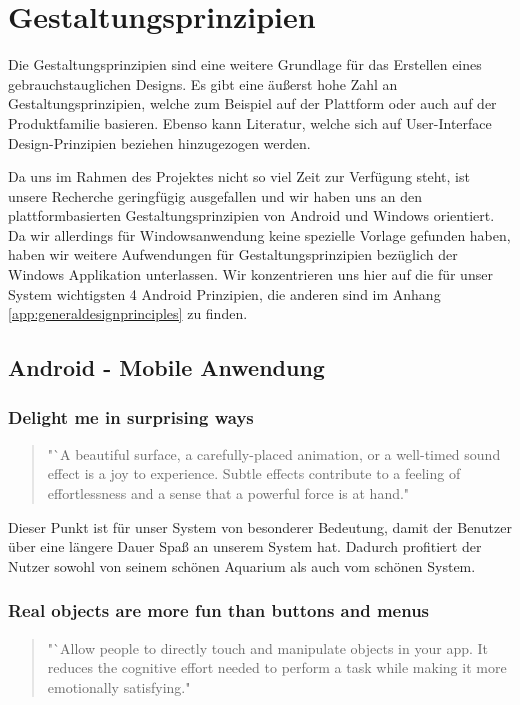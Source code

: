 \chapter{Gestaltungsprinzipien}
Die Gestaltungsprinzipien sind eine weitere Grundlage für das Erstellen eines gebrauchstauglichen Designs. Es gibt eine äußerst hohe Zahl an Gestaltungsprinzipien, welche zum Beispiel auf der Plattform oder auch auf der Produktfamilie basieren. Ebenso kann Literatur, welche sich auf User-Interface Design-Prinzipien beziehen hinzugezogen werden. 

Da uns im Rahmen des Projektes nicht so viel Zeit zur Verfügung steht, ist unsere Recherche geringfügig ausgefallen und wir haben uns an den plattformbasierten Gestaltungsprinzipien von Android \cite{Android:designprinciples} und Windows orientiert. Da wir allerdings für Windowsanwendung keine spezielle Vorlage gefunden haben, haben wir weitere Aufwendungen für Gestaltungsprinzipien bezüglich der Windows Applikation unterlassen. Wir konzentrieren uns hier auf die für unser System wichtigsten 4 Android Prinzipien, die anderen sind im Anhang \ref{app:generaldesignprinciples} zu finden.

\section{Android - Mobile Anwendung}

\subsection{Delight me in surprising ways}\label{rule:1}
\begin{quote} "`A beautiful surface, a carefully-placed animation, or a well-timed sound effect is a joy to experience. Subtle effects contribute to a feeling of effortlessness and a sense that a powerful force is at hand."
\end{quote}

Dieser Punkt ist für unser System von besonderer Bedeutung, damit der Benutzer über eine längere Dauer Spaß an unserem System hat. Dadurch profitiert der Nutzer sowohl von seinem schönen Aquarium als auch vom schönen System.
 
\subsection{Real objects are more fun than buttons and menus}\label{rule:2}
\begin{quote} "`Allow people to directly touch and manipulate objects in your app. It reduces the cognitive effort needed to perform a task while making it more emotionally satisfying."\end{quote}

